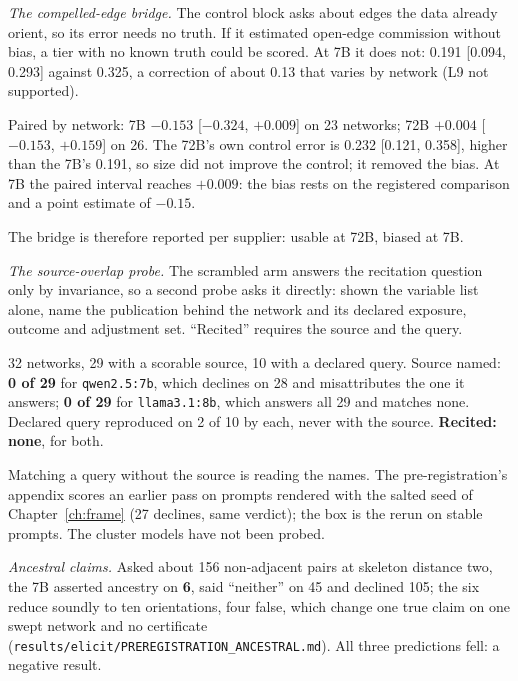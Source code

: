 \emph{The compelled-edge bridge.} The control block asks about edges the data already orient, so its
error needs no truth. If it estimated open-edge commission without bias, a tier with no known truth
could be scored. At 7B it does not: 0.191 [0.094, 0.293] against 0.325, a correction of about 0.13 that
varies by network (L9 not supported).

\begin{medido}
Paired by network: 7B \textbf{$-0.153$} [$-0.324$, $+0.009$] on 23 networks; 72B \textbf{$+0.004$}
[$-0.153$, $+0.159$] on 26. The 72B's own control error is 0.232 [0.121, 0.358], higher than the 7B's
0.191, so size did not improve the control; it removed the bias. At 7B the paired interval reaches
$+0.009$: the bias rests on the registered comparison and a point estimate of $-0.15$.
\end{medido}

The bridge is therefore reported per supplier: usable at 72B, biased at 7B.

\emph{The source-overlap probe.} The scrambled arm answers the recitation question only by invariance,
so a second probe asks it directly: shown the variable list alone, name the publication behind the
network and its declared exposure, outcome and adjustment set. ``Recited'' requires the source and the
query.

\begin{medido}
32 networks, 29 with a scorable source, 10 with a declared query. Source named: \textbf{0 of 29} for
\texttt{qwen2.5:7b}, which declines on 28 and misattributes the one it answers; \textbf{0 of 29} for
\texttt{llama3.1:8b}, which answers all 29 and matches none. Declared query reproduced on 2 of 10 by
each, never with the source. \textbf{Recited: none}, for both.
\end{medido}

Matching a query without the source is reading the names. The pre-registration's appendix scores an
earlier pass on prompts rendered with the salted seed of Chapter~\ref{ch:frame} (27 declines, same
verdict); the box is the rerun on stable prompts. The cluster models have not been probed.

\emph{Ancestral claims.} Asked about 156 non-adjacent pairs at skeleton distance two, the 7B asserted
ancestry on \textbf{6}, said ``neither'' on 45 and declined 105; the six reduce soundly to ten
orientations, four false, which change one true claim on one swept network and no certificate
(\texttt{results/elicit/PREREGISTRATION\_ANCESTRAL.md}). All three predictions fell: a negative result.

